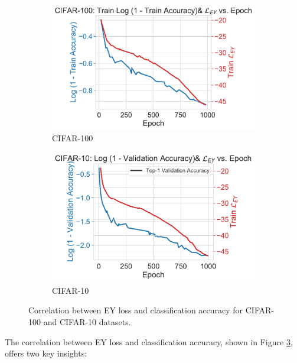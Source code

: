 \begin{figure}[H]
    \begin{subfigure}[b]{0.48\textwidth}
        \centering
        \includegraphics[width=\textwidth]{figures/SSL/cifar100_corr_vs_acc_log_error}
        \caption{CIFAR-100}
        \label{fig:ssl_learning_curve_cifar100_vs_corr}
    \end{subfigure}
    \hfill
    \begin{subfigure}[b]{0.48\textwidth}
        \centering
        \includegraphics[width=\textwidth]{figures/SSL/cifar10_corr_vs_acc_log_error}
        \caption{CIFAR-10}
        \label{fig:ssl_learning_curve_cifar10_vs_corr}
    \end{subfigure}
    \caption{Correlation between EY loss and classification accuracy for CIFAR-100 and CIFAR-10 datasets.}
    \label{fig:ssl_ey_vs_acc}
\end{figure}

The correlation between EY loss and classification accuracy, shown in Figure \ref{fig:ssl_ey_vs_acc}, offers two key insights:

